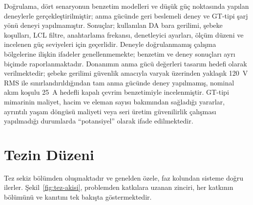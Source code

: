Doğrulama, dört senaryonun benzetim modelleri ve düşük güç noktasında yapılan deneylerle gerçekleştirilmiştir; anma gücünde geri beslemeli deney ve GT-tipi şarj yönü deneyi yapılmamıştır. Sonuçlar; kullanılan DA bara gerilimi, şebeke koşulları, LCL filtre, anahtarlama frekansı, denetleyici ayarları, ölçüm düzeni ve incelenen güç seviyeleri için geçerlidir. Deneyle doğrulanmamış çalışma bölgelerine ilişkin ifadeler genellenmemekte; benzetim ve deney sonuçları ayrı biçimde raporlanmaktadır. Donanımın anma gücü değerleri tasarım hedefi olarak verilmektedir; şebeke gerilimi güvenlik amacıyla varyak üzerinden yaklaşık \SI{120}{\volt} RMS ile sınırlandırıldığından tam anma gücünde deney yapılmamış, nominal akım koşulu \SI{25}{\ampere} hedefli kapalı çevrim benzetimiyle incelenmiştir. GT-tipi mimarinin maliyet, hacim ve eleman sayısı bakımından sağladığı yararlar, ayrıntılı yaşam döngüsü maliyeti veya seri üretim güvenilirlik çalışması yapılmadığı durumlarda ``potansiyel'' olarak ifade edilmektedir.

\section{Tezin Düzeni}
\label{sec:giris-duzen}

Tez sekiz bölümden oluşmaktadır ve genelden özele, faz kolundan sisteme doğru ilerler. Şekil~\ref{fig:tez-akisi}, problemden katkılara uzanan zinciri, her katkının bölümünü ve kanıtını tek bakışta göstermektedir.

